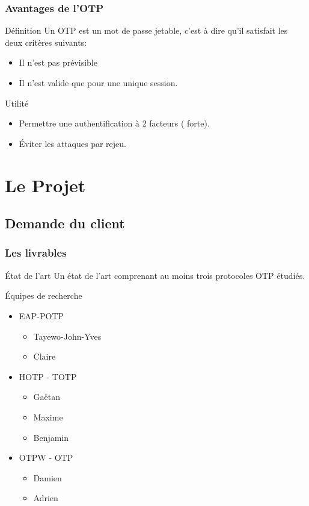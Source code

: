 \documentclass[xcolor=table]{beamer}
\begin{document}
\begin{frame}
\frametitle{Avantages de l'OTP}
\begin{block}{Définition}
    Un OTP est un mot de passe jetable, c'est à dire qu'il satisfait les deux 
  critères suivants:
  \begin{itemize}
    \item Il n'est pas prévisible
    \item Il n'est valide que pour une unique session.
  \end{itemize}
\end{block}

\begin{block}{Utilité}
  \begin{itemize}
    \item Permettre une authentification à 2 facteurs (\og{} forte\fg{}).
    \item Éviter les attaques par rejeu.
  \end{itemize}
\end{block}
\end{frame}

\section{Le Projet}

\subsection{Demande du client}

\begin{frame}
\frametitle{Les livrables}
\begin{block}{État de l'art} 
Un état de l'art comprenant au moins trois protocoles OTP étudiés.
\end{block}
\begin{block}{Équipes de recherche}
  \begin{itemize}
    \item EAP-POTP
    \begin{itemize}
      \item Tayewo-John-Yves 
      \item Claire 
    \end{itemize}
    \item HOTP - TOTP
    \begin{itemize}
      \item Gaëtan 
      \item Maxime 
      \item Benjamin 
    \end{itemize}
    \item OTPW - OTP
    \begin{itemize}
      \item Damien 
      \item Adrien 
    \end{itemize}
  \end{itemize}
\end{block}
\end{frame}
\end{document}
